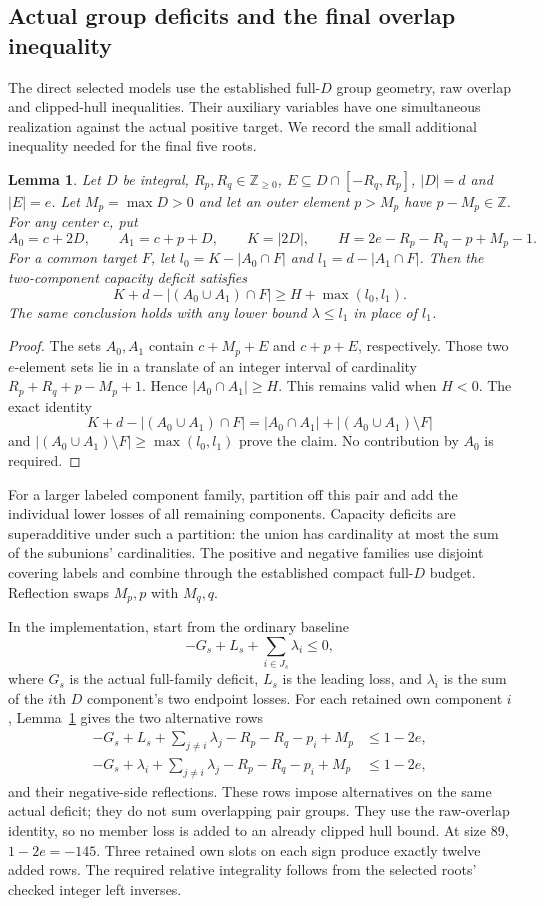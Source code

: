 \documentclass[11pt,a4paper]{article}
\newtheorem{lemma}[theorem]{Lemma}
\theoremstyle{remark}
\newcommand{\Z}{\mathbb Z}
\begin{document}
\subsection{Actual group deficits and the final overlap inequality}
The direct selected models use the established full-$D$ group geometry,
raw overlap and clipped-hull inequalities. Their auxiliary variables
have one simultaneous realization against the actual positive target.
We record the small additional inequality needed for the final five
roots.

\begin{lemma}\label{u86:lem:translatedcore89}
Let $D$ be integral, $R_p,R_q\in\Z_{\ge0}$,
$E\subseteq D\cap[-R_q,R_p]$, $|D|=d$ and
$|E|=e$. Let $M_p=\max D>0$ and let an outer element $p>M_p$ have
$p-M_p\in\Z$. For any center $c$, put
\[
 A_0=c+2D,\qquad A_1=c+p+D,\qquad K=|2D|,
 \qquad H=2e-R_p-R_q-p+M_p-1.
\]
For a common target $F$, let $l_0=K-|A_0\cap F|$ and
$l_1=d-|A_1\cap F|$. Then the two-component capacity deficit satisfies
\[
 K+d-|(A_0\cup A_1)\cap F|\ge H+\max(l_0,l_1).
\]
The same conclusion holds with any lower bound $\lambda\le l_1$ in
place of $l_1$.
\end{lemma}
\begin{proof}
The sets $A_0,A_1$ contain $c+M_p+E$ and $c+p+E$, respectively.
Those two $e$-element sets lie in a translate of an integer interval of
cardinality $R_p+R_q+p-M_p+1$. Hence
$|A_0\cap A_1|\ge H$. This remains valid when $H<0$.
The exact identity
\[
 K+d-|(A_0\cup A_1)\cap F|
 =|A_0\cap A_1|+|(A_0\cup A_1)\setminus F|
\]
and $|(A_0\cup A_1)\setminus F|\ge\max(l_0,l_1)$ prove the claim.
No contribution by $A_0$ is required.
\end{proof}

For a larger labeled component family, partition off this pair and add
the individual lower losses of all remaining components. Capacity
deficits are superadditive under such a partition: the union has
cardinality at most the sum of the subunions' cardinalities.
The positive and negative families use disjoint covering labels and
combine through the established compact full-$D$ budget.
Reflection swaps $M_p,p$ with $M_q,q$.

In the implementation, start from the ordinary baseline
\[
 -G_s+L_s+\sum_{i\in J_s}\lambda_i\le0,
\]
where $G_s$ is the actual full-family deficit, $L_s$ is the leading loss,
and $\lambda_i$ is the sum of the $i$th $D$ component's two endpoint losses.
For each retained own component $i$, Lemma~\ref{u86:lem:translatedcore89}
gives the two alternative rows
\begin{align*}
 -G_s+L_s+\sum_{j\ne i}\lambda_j
                  -R_p-R_q-p_i+M_p&\le1-2e,\\
 -G_s+\lambda_i+\sum_{j\ne i}\lambda_j
                  -R_p-R_q-p_i+M_p&\le1-2e,
\end{align*}
and their negative-side reflections. These rows impose alternatives
on the same actual deficit; they do not sum overlapping pair groups.
They use the raw-overlap identity, so no member loss is added to an
already clipped hull bound. At size 89, $1-2e=-145$.
Three retained own slots on each sign produce exactly twelve added rows.
The required relative integrality follows from the selected roots'
checked integer left inverses.
\end{document}
